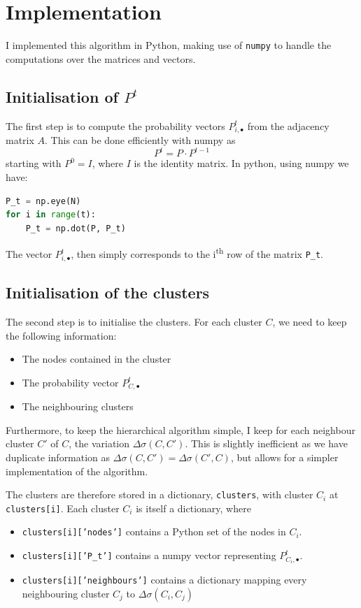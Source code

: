 \documentclass[12pt]{article}
\theoremstyle{definition}
\begin{document}

\section{Implementation}
I implemented this algorithm in Python, making use of \texttt{numpy} to handle the computations over the matrices and vectors.

\subsection{Initialisation of $P^t$}
The first step is to compute the probability vectors $P_{i,\bullet}^t$ from the adjacency matrix $A$. This can be done efficiently with numpy as 
\[ P^t = P \cdot P^{t-1} \]
starting with $P^0=I$, where $I$ is the identity matrix. In python, using numpy we have:
\begin{lstlisting}[language=Python]
P_t = np.eye(N)
for i in range(t):
    P_t = np.dot(P, P_t)
\end{lstlisting}
The vector $P_{i,\bullet}^t$, then simply corresponds to the i\textsuperscript{th} row of the matrix \texttt{P\_t}.

\subsection{Initialisation of the clusters}
The second step is to initialise the clusters. For each cluster $C$, we need to keep the following information:
\begin{itemize}
	\item The nodes contained in the cluster
	\item The probability vector $P_{C,\bullet}^t$
	\item The neighbouring clusters
\end{itemize}
Furthermore, to keep the hierarchical algorithm simple, I keep for each neighbour cluster $C'$ of $C$, the variation $\Delta\sigma(C,C')$. This is slightly inefficient as we have duplicate information as $\Delta\sigma(C,C') = \Delta\sigma(C',C)$, but allows for a simpler implementation of the algorithm.

\bigskip

The clusters are therefore stored in a dictionary, \texttt{clusters}, with cluster $C_i$ at \texttt{clusters[i]}. Each cluster $C_i$ is itself a dictionary, where
\begin{itemize}
	\item \texttt{clusters[i]['nodes']} contains a Python set of the nodes in $C_i$.
	\item \texttt{clusters[i]['P\_t']} contains a numpy vector representing $P_{C_i,\bullet}^t$.
	\item \texttt{clusters[i]['neighbours']} contains a dictionary mapping every neighbouring cluster $C_j$ to $\Delta\sigma(C_i,C_j)$
\end{itemize}
\end{document}
